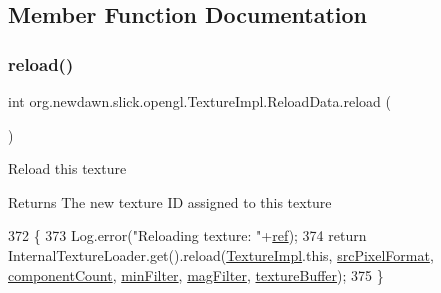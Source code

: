 \subsection{Member Function Documentation}
\mbox{\label{classorg_1_1newdawn_1_1slick_1_1opengl_1_1_texture_impl_1_1_reload_data_a9aa3b4822b2ecf2bdd34e0e5d1df9c46}} 
\subsubsection{\texorpdfstring{reload()}{reload()}}
{\footnotesize\ttfamily int org.\+newdawn.\+slick.\+opengl.\+Texture\+Impl.\+Reload\+Data.\+reload (\begin{DoxyParamCaption}{ }\end{DoxyParamCaption})\hspace{0.3cm}{\ttfamily [inline]}}

Reload this texture

\begin{DoxyReturn}{Returns}
The new texture ID assigned to this texture 
\end{DoxyReturn}

\begin{DoxyCode}
372                             \{
373             Log.error(\textcolor{stringliteral}{"Reloading texture: "}+\mbox{\hyperlink{classorg_1_1newdawn_1_1slick_1_1opengl_1_1_texture_impl_af482ec27b29b8846d98ce87bfcd88223}{ref}});
374             \textcolor{keywordflow}{return} InternalTextureLoader.get().reload(\mbox{\hyperlink{classorg_1_1newdawn_1_1slick_1_1opengl_1_1_texture_impl_aec5b5fc2b1fb2633b6691e99a08ac43c}{TextureImpl}}.this, 
      \mbox{\hyperlink{classorg_1_1newdawn_1_1slick_1_1opengl_1_1_texture_impl_1_1_reload_data_a174e77c29132037a4d4a634ec08cabd0}{srcPixelFormat}}, \mbox{\hyperlink{classorg_1_1newdawn_1_1slick_1_1opengl_1_1_texture_impl_1_1_reload_data_ac4fd20a95b32ccb61b7a87127d56af7b}{componentCount}}, \mbox{\hyperlink{classorg_1_1newdawn_1_1slick_1_1opengl_1_1_texture_impl_1_1_reload_data_a2bda7bd341fa651a6be485f893e95ed4}{minFilter}}, 
      \mbox{\hyperlink{classorg_1_1newdawn_1_1slick_1_1opengl_1_1_texture_impl_1_1_reload_data_ad77e258620f00922337a119e09db0c7a}{magFilter}}, \mbox{\hyperlink{classorg_1_1newdawn_1_1slick_1_1opengl_1_1_texture_impl_1_1_reload_data_afd42846541be05f57d9bca24c04b52b8}{textureBuffer}});
375         \}
\end{DoxyCode}


